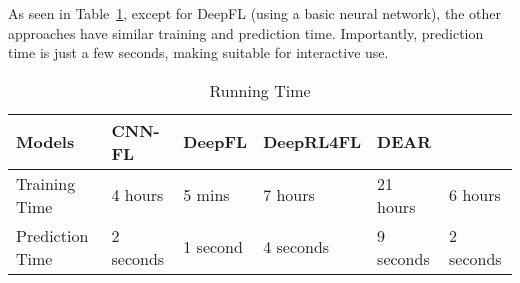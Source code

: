  As seen in Table~\ref{tab:time}, except
for DeepFL (using a basic neural network), 
the other approaches have similar training and prediction
time. Importantly, prediction time is just a few seconds, making
{\tool} suitable for interactive use.



\begin{table}[t]
	\caption{Running Time}
	\vspace{-12pt}
	\begin{center}
        \tabcolsep 2pt
		\footnotesize
		\renewcommand{\arraystretch}{1} 
		\begin{tabular}{p{1.6cm}<{\centering}|p{1cm}<{\centering}|p{1cm}<{\centering}|p{1.2cm}<{\centering}|p{1cm}<{\centering}|p{1.1cm}<{\centering}}
			\hline
			Models          & CNN-FL & DeepFL & DeepRL4FL & DEAR & {\tool} \\\hline
			Training Time & 4 hours & 5 mins & 7 hours & 21 hours & 6 hours \\
			Prediction Time & 2 seconds & 1 second & 4 seconds &9 seconds & 2 seconds\\ 
			\hline
		\end{tabular}
		\label{tab:time}
	\end{center}
\vspace{-5pt}
\end{table}
